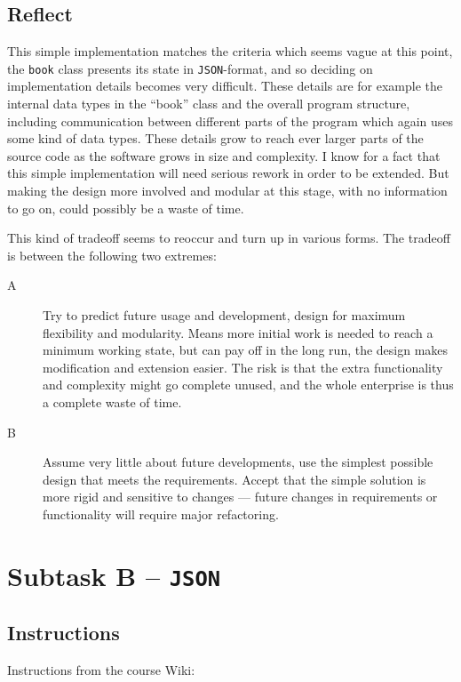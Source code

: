 \subsection{Reflect}\label{task-1a-reflect}
This simple implementation matches the criteria which seems vague at this point,
the \texttt{book} class presents its state in \texttt{JSON}-format, and so deciding on
implementation details becomes very difficult. These details are for example
the internal data types in the ``book'' class and the overall program
structure, including communication between different parts of the program which
again uses some kind of data types.
These details grow to reach ever larger parts of the source code as the software
grows in size and complexity.
I know for a fact that this simple implementation will need serious rework
in order to be extended. But making the design more involved and modular
at this stage, with no information to go on, could possibly be a waste of time.

This kind of tradeoff seems to reoccur and turn up in various forms.
The tradeoff is between the following two extremes:

\begin{description}
  \item [A] Try to predict future usage and development, design for maximum
        flexibility and modularity. Means more initial work is needed to reach
        a minimum working state, but can pay off in the long run, the design
        makes modification and extension easier.  The risk is that the extra
        functionality and complexity might go complete unused, and the whole
        enterprise is thus a complete waste of time.
  \item [B] Assume very little about future developments, use the simplest
        possible design that meets the requirements. Accept that the simple
        solution is more rigid and sensitive to changes --- future changes in
        requirements or functionality will require major refactoring.
\end{description}


\section{Subtask B -- \texttt{JSON}}\label{subtask-b-json}
\subsection{Instructions}\label{task-1b-instructions}
Instructions from the course Wiki\cite{1dv600:lab1:instructions}:

